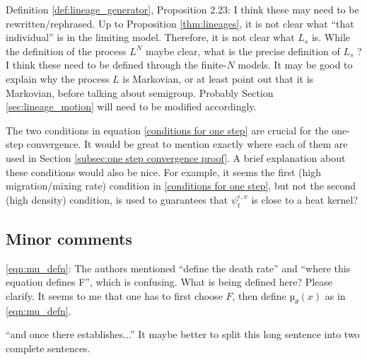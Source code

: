 \reply{
}

\begin{point}{\revref}
Definition \ref{def:lineage_generator}, Proposition 2.23: I think these may need to be rewritten/rephrased. Up
to Proposition \ref{thm:lineages}, it is not clear what ``that individual'' is in the limiting model. Therefore,
it is not clear what $L_s$ is. While the definition of the process $L^N$ maybe clear, what is the
precise definition of $L_s$ ? I think these need to be defined through the finite-$N$ models. It may
be good to explain why the process $L$ is Markovian, or at least point out that it is Markovian,
before talking about semigroup. Probably Section \ref{sec:lineage_motion} will need to be modified accordingly.
\end{point}


\begin{point}{\revref}
The two conditions in equation \eqref{conditions for one step} are crucial for the one-step convergence.
It would be great to mention exactly where each of them are used in Section \ref{subsec:one step convergence proof}.
A brief explanation about these conditions would also be nice. For example, it seems the first (high
migration/mixing rate) condition in \eqref{conditions for one step},
but not the second (high density) condition, is used
to guarantees that $\psi_t^{\epsilon,x}$ is close to a heat kernel?
\end{point}


\subsection*{Minor comments}

\begin{point}{\revref}
\eqref{eqn:mu_defn}: The authors mentioned ``define the death rate'' and ``where this equation defines F'',
which is confusing. What is being defined here? Please clarify. It seems to me that one has
to first choose $F$, then define $µ_\theta(x)$ as in \eqref{eqn:mu_defn}.
\end{point}

\reply{
}

\begin{point}{\revref}
``and once there establishes...'' It maybe better to split this
long sentence into two complete sentences.
\end{point}

